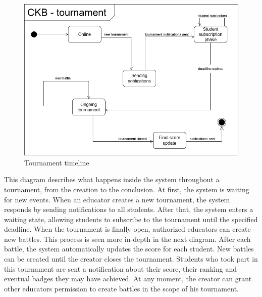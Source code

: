 \begin{figure}[H]
      \centering
      \includegraphics[scale=0.4]{src/state_diagrams/tournament_uml.png}
      \caption{Tournament timeline}
\end{figure} \vspace{1cm}
    This diagram describes what happens inside the system throughout a tournament, from the creation to the conclusion. At first, the system is waiting for new events. When an educator creates a new tournament, the system responds by sending notifications to all students. After that, the system enters a waiting state, allowing students to subscribe to the tournament until the specified deadline. When the tournament is finally open, authorized educators can create new battles. This process is seen more in-depth in the next diagram. After each battle, the system automatically updates the score for each student. New battles can be created until the creator closes the tournament. Students who took part in this tournament are sent a notification about their score, their ranking and eventual badges they may have achieved. At any moment, the creator can grant other educators permission to create battles in the scope of his tournament. \\

